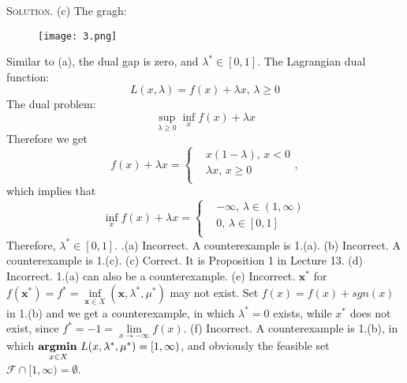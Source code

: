 \documentclass[12pt, a4paper, oneside]{ctexart}
\newenvironment{solution}{\par\noindent\textsc{Solution. }}{\\\par}
\DeclareMathOperator*{\argmin}{\bf argmin\,}
\begin{document}
\begin{solution}
	\newline\newline
	(c) The gragh:
	\begin{figure}[htbp]
		\centering
		\texttt{[image: 3.png]}
	\end{figure}
	\newline
	Similar to (a), the dual gap is zero, and $\lambda^*\in [0,1]$. \newline
	The Lagrangian dual function:
	\[
	L(x,\lambda)=f(x)+\lambda x,\, \lambda\geq0
	\]
	The dual problem: 
	\[
	\sup\limits_{\lambda\geq 0}\inf\limits_x f(x)+\lambda x
	\]
	Therefore we get
	\[
	f(x)+\lambda x =
	\left\lbrace
    \begin{aligned}
    	& x(1-\lambda),\, x < 0 \\
    	& \lambda x,\, x \geq 0 \\
    \end{aligned}
    \right.,
	\]
	which implies that
	\[
	\inf\limits_x f(x)+\lambda x =
	\left\lbrace
    \begin{aligned}
    	& -\infty,\, \lambda\in(1,\infty) \\
    	& 0,\, \lambda\in[0,1] \\
    \end{aligned}
    \right.	
	\]
	Therefore, $\lambda^*\in [0,1]$.
	\newline{}.(a) Incorrect. A counterexample is 1.(a).
	\newline\newline
	(b) Incorrect. A counterexample is 1.(c).
	\newline\newline
	(c) Correct. It is Proposition 1 in Lecture 13.
	\newline\newline
	(d) Incorrect. 1.(a) can also be a counterexample.
	\newline\newline
	(e) Incorrect. $\mathbf{x}^*$ for $f(\mathbf{x}^*) = f^* = \inf\limits_{\mathbf{x}\in X}(\mathbf{x},\lambda^*,\mu^*)$ may not exist. \newline
	Set $f(x) = f(x) + sgn(x)$ in 1.(b) and we get a counterexample, in which $\lambda^* = 0$ exists, while $x^*$ does not exist, since $f^* = -1 = \lim\limits_{x\to-\infty}f(x)$.
	\newline\newline
	(f) Incorrect. A counterexample is 1.(b), in which $\argmin\limits_{x\in X}L(x,\lambda^*,\mu^*) = [1,\infty)$, and obviously the feasible set $\mathcal{F}\cap[1,\infty)=\emptyset$.
\end{solution}
\end{document}
